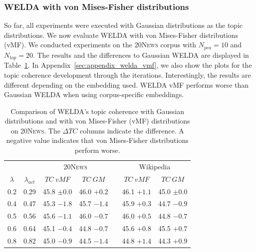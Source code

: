 \documentclass[
        a4paper,
        titlepage,
        twoside,
        parskip,
        numbers=noenddot
        ]{scrbook}
\newcommand{\ra}[1]{\renewcommand{\arraystretch}{#1}}
\theoremstyle{break}
\begin{document}
\subsubsection{WELDA with von Mises-Fisher distributions}

So far, all experiments were executed with Gaussian distributions as the topic distributions.
We now evaluate WELDA with von Mises-Fisher distributions (vMF).
We conducted experiments on the \textsc{20News} corpus with $N_{pca} = 10$ and $N_{top} = 20$.
The results and the differences to Gaussian WELDA are displayed in Table~\ref{table:welda_vmf}.
In Appendix~\ref{sec:appendix_welda_vmf}, we also show the plots for the topic coherence development through the iterations.
Interestingly, the results are different depending on the embedding used.
WELDA vMF performs worse than Gaussian WELDA when using corpus-specific embeddings.

\begin{table}[]
  \ra{1.3}
  \centering
  \caption{Comparison of WELDA's topic coherence with Gaussian distributions and with von Mises-Fisher (vMF) distributions on \textsc{20News}. The $\Delta TC$ columns indicate the difference. A negative value indicates that von Mises-Fisher distributions perform worse.}
  \label{table:welda_vmf}
  \begin{tabular}{@{}ccccccc@{}}
    \toprule
                     &                 & \multicolumn{2}{c}{\textsc{20News}} && \multicolumn{2}{c}{Wikipedia} \\
           \cmidrule{3-4} \cmidrule{6-7}
           $\lambda$ & $\lambda_{act}$ & $TC~vMF$        & $TC~GM$ &           & $TC~vMF$         & $TC~GM$      \\
           \midrule
           0.2       & 0.29            & 45.8 $\pm 0.0$  & 46.0 $+0.2$    && 46.1   $+1.1$  & 45.0 $\pm 0.0$ \\
           0.4       & 0.47            & 45.3 $-1.8$     & 45.7 $-1.4$    && 45.9   $+0.3$  & 44.7 $-0.9$     \\
           0.5       & 0.56            & 45.6 $-1.1$     & 46.0 $-0.7$    && 46.0   $+0.5$  & 44.8 $-0.7$     \\
           0.6       & 0.64            & 45.1 $-0.4$     & 44.8 $-0.7$    && 45.6   $+0.8$  & 45.5 $+0.7$     \\
           0.8       & 0.82            & 45.0 $-0.9$     & 44.5 $-1.4$    && 44.8   $+1.4$  & 44.3 $+0.9$     \\ \bottomrule
  \end{tabular}
\end{table}
\end{document}
